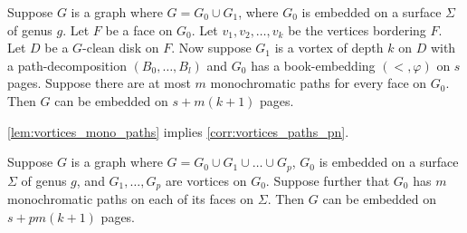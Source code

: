 \begin{lemma}\label{lem:vortices_mono_paths}
	Suppose \(G\) is a graph where $G = G_0 \cup G_1$, where \(G_0\) is embedded on a surface \(\Sigma \) of genus \(g\). Let \(F\) be a face on \(G_0\). Let \(v_1, v_2, \ldots, v_k\) be the vertices bordering \(F\). Let \(D\) be a \(G\)-clean disk on \(F\). Now suppose \(G_1\) is a vortex of depth $k$ on \(D\) with a path-decomposition \((B_0, \ldots, B_l)\) and \(G_0\) has a book-embedding \((<, \varphi)\) on $s$ pages. Suppose there are at most \(m\) monochromatic paths for every face on $G_0$. Then \(G\) can be embedded on \(s + m(k+1)\) pages.
\end{lemma}

\cref{lem:vortices_mono_paths} implies \cref{corr:vortices_paths_pn}.

\begin{corollary}\label{corr:vortices_paths_pn}
	Suppose $G$ is a graph where $G = G_0 \cup G_1 \cup \ldots \cup G_p$, $G_0$ is embedded on a surface $\Sigma$ of genus $g$, and $G_1, \ldots ,G_p$ are vortices on $G_0$. Suppose further that $G_0$ has $m$ monochromatic paths on each of its faces on $\Sigma$. Then $G$ can be embedded on $s + pm(k+1)$ pages.
\end{corollary}

